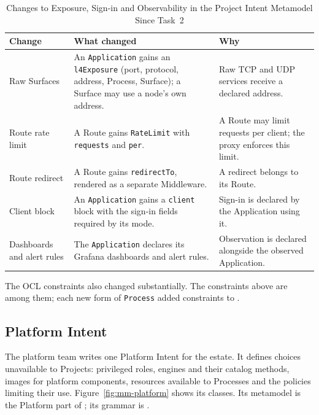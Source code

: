 \begin{table}[!htbp]
\centering
\footnotesize
\begin{tabular}{>{\raggedright\arraybackslash}p{}>{\raggedright\arraybackslash}p{}>{\raggedright\arraybackslash}p{}}
\hline
\textbf{Change} & \textbf{What changed} & \textbf{Why} \\
\hline
Raw Surfaces & An \texttt{Application} gains an \texttt{l4Exposure} (port, protocol, address, Process, Surface); a Surface may use a node's own address. & Raw TCP and UDP services receive a declared address. \\
Route rate limit & A Route gains \texttt{RateLimit} with \texttt{requests} and \texttt{per}. & A Route may limit requests per client; the proxy enforces this limit. \\
Route redirect & A Route gains \texttt{redirectTo}, rendered as a separate Middleware. & A redirect belongs to its Route. \\
Client block & An \texttt{Application} gains a \texttt{client} block with the sign-in fields required by its mode. & Sign-in is declared by the Application using it. \\
Dashboards and alert rules & The \texttt{Application} declares its Grafana dashboards and alert rules. & Observation is declared alongside the observed Application. \\
\hline
\end{tabular}
\caption{Changes to Exposure, Sign-in and Observability in the Project Intent Metamodel Since Task~2}
\label{tab:app-source-3}
\end{table}

The OCL constraints also changed substantially. The constraints above are among them; each new form of \texttt{Process} added constraints to
.

\subsection{Platform Intent}
\label{sec:appendix-platform}

The platform team writes one Platform Intent for the estate. It defines choices
unavailable to Projects: privileged roles, engines and their catalog methods,
images for platform components, resources available to Processes and
the policies limiting their use. Figure~\ref{fig:mm-platform} shows its classes.
Its metamodel is the Platform part of ; its grammar is
.

